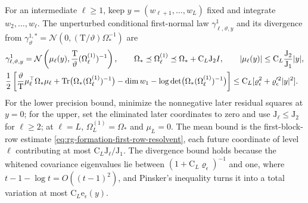 For an intermediate \(\ell\ge1\), keep \(y=(w_{\ell+1},\ldots,w_L)\) fixed and
integrate \(w_2,\ldots,w_\ell\). The unperturbed conditional first-normal law
\(\gamma^1_{\ell,\vartheta,y}\) and its divergence from
\(\gamma^{1,*}_\vartheta=\mathcal N(0,(\mathrm T/\vartheta)\Omega_*^{-1})\) are
\begin{align}
 &\gamma^1_{\ell,\vartheta,y}
 =\mathcal N\left(\mu_\ell(y),\frac{\mathrm T}{\vartheta}(\Omega^{(1)}_\ell)^{-1}\right),\qquad
 \Omega_*\preceq\Omega^{(1)}_\ell\preceq\Omega_*+\mathrm C_L\mathrm J_2I,\qquad
 |\mu_\ell(y)|\le \mathrm C_L\frac{\mathrm J_2}{\mathrm J_1}|y|,
 \label{eq:rg-formation-first-normal-conditional}\\
 &\frac12\left[
  \frac{\vartheta}{\mathrm T}\mu_\ell^\top\Omega_*\mu_\ell
  +\operatorname{Tr}\bigl(\Omega_*(\Omega^{(1)}_\ell)^{-1}\bigr)-\dim w_1
            -\log\det\bigl(\Omega_*(\Omega^{(1)}_\ell)^{-1}\bigr)\right]
 \le \mathrm C_L[\varrho_\epsilon^2+\varrho_\epsilon'^2|y|^2].
 \label{eq:rg-formation-first-normal-gaussian-kl}
\end{align}
For the lower precision bound, minimize the nonnegative later residual squares
at \(y=0\); for the upper, set the eliminated later coordinates to zero and use
\(\mathrm J_\ell\le\mathrm J_2\) for \(\ell\ge2\); at \(\ell=L\),
\(\Omega^{(1)}_L=\Omega_*\) and \(\mu_L=0\). The mean bound is the
first-block-row estimate \cref{eq:rg-formation-first-row-resolvent}, each
future coordinate of level \(\ell\) contributing at most
\(\mathrm C_L\mathrm J_\ell/\mathrm J_1\). The divergence bound holds because
the whitened covariance eigenvalues lie between
\((1+\mathrm C_L\varrho_\epsilon)^{-1}\) and one, where
\(t-1-\log t=O((t-1)^2)\), and Pinsker's inequality turns it into a total
variation at most \(\mathrm C_L\mathrm e_\epsilon(y)\).

